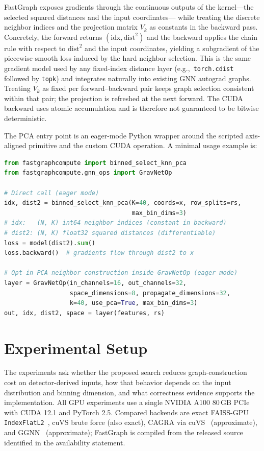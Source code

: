 \documentclass[final,3p,11pt]{elsarticle}
\begin{document}
FastGraph exposes gradients through the continuous outputs of the
kernel---the selected squared distances and the input coordinates---
while treating the discrete neighbor indices and the projection
matrix $V_k$ as constants in the backward pass. Concretely, the
forward returns $(\text{idx}, \text{dist}^2)$ and the backward
applies the chain rule with respect to $\text{dist}^2$ and the input
coordinates, yielding a subgradient of the piecewise-smooth loss
induced by the hard neighbor selection. This is the same gradient
model used by any fixed-index distance layer
(e.g.,\ \texttt{torch.cdist} followed by \texttt{topk}) and integrates
naturally into existing GNN autograd graphs. Treating $V_k$ as fixed per forward--backward pair keeps graph selection
consistent within that pair; the projection is refreshed at the next forward.
The CUDA backward uses atomic accumulation and is therefore not guaranteed
to be bitwise deterministic.

The PCA entry point is an eager-mode Python wrapper around the scripted
axis-aligned primitive and the custom CUDA operation. A minimal usage
example is:

\begin{lstlisting}[language=Python, float=htbp, caption={Minimal eager-mode PCA-FastGraph usage.}]
from fastgraphcompute import binned_select_knn_pca
from fastgraphcompute.gnn_ops import GravNetOp

# Direct call (eager mode)
idx, dist2 = binned_select_knn_pca(K=40, coords=x, row_splits=rs,
                                   max_bin_dims=3)
# idx:   (N, K) int64 neighbor indices (constant in backward)
# dist2: (N, K) float32 squared distances (differentiable)
loss = model(dist2).sum()
loss.backward()  # gradients flow through dist2 to x

# Opt-in PCA neighbor construction inside GravNetOp (eager mode)
layer = GravNetOp(in_channels=16, out_channels=32,
                  space_dimensions=8, propagate_dimensions=32,
                  k=40, use_pca=True, max_bin_dims=3)
out, idx, dist2, space = layer(features, rs)
\end{lstlisting}

\FloatBarrier
\section{Experimental Setup}
\label{sec:expsetup}

The experiments ask whether the proposed search reduces graph-construction
cost on detector-derived inputs, how that behavior depends on the input
distribution and binning dimension, and what correctness evidence supports
the implementation. All GPU experiments use a single NVIDIA A100 80\,GB PCIe with CUDA
12.1 and PyTorch 2.5. Compared backends are exact FAISS-GPU
\texttt{IndexFlatL2}~\cite{johnson2019billion}, cuVS brute force
(also exact), CAGRA via cuVS~\cite{ootomo2023cagra}
(approximate), and GGNN~\cite{ggnn} (approximate); FastGraph is
compiled from the released source identified in the availability statement.
\end{document}
